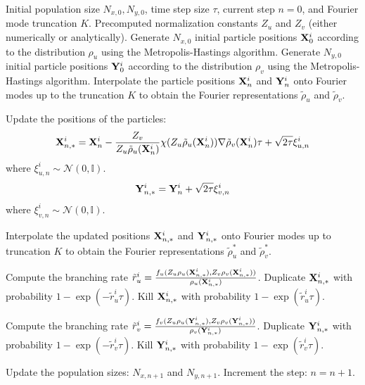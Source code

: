 \documentclass[12pt]{article}
\begin{document}
\begin{algorithm}
\caption{Stochastic Branching Method for the KS Equation}\label{alg:cap}
\begin{algorithmic}
\Require Initial population size $N_{x,0}, N_{y,0}$, time step size $\tau$, current step $n = 0$, and Fourier mode truncation $K$.
\Require Precomputed normalization constants $Z_u$ and $Z_v$ (either numerically or analytically).
\State Generate $N_{x,0}$ initial particle positions $\mathbf{X}^i_0$ according to the distribution $\rho_u$ using the Metropolis-Hastings algorithm.
\State Generate $N_{y,0}$ initial particle positions $\mathbf{Y}^i_0$ according to the distribution $\rho_v$ using the Metropolis-Hastings algorithm.
\State Interpolate the particle positions $\mathbf{X}^i_n$ and $\mathbf{Y}^i_n$ onto Fourier modes up to the truncation $K$ to obtain the Fourier representations $\tilde{\rho}_u$ and $\tilde{\rho}_v$.

 
    \State Update the positions of the particles:
        \[
        \mathbf{X}^i_{n,*} = \mathbf{X}^i_n - \frac{Z_v}{Z_u \tilde{\rho}_u(\mathbf{X}^i_n)} \chi(Z_u \tilde{\rho}_u(\mathbf{X}^i_n)) \nabla \tilde{\rho}_v(\mathbf{X}^i_n) \tau + \sqrt{2\tau} \xi^{i}_{u,n}
        \]
        where $\xi^{i}_{u,n} \sim \mathcal{N}(0, \mathbb{I})$.
    \EndFor
        \[
        \mathbf{Y}^i_{n,*} = \mathbf{Y}^i_n + \sqrt{2\tau} \xi^{i}_{v,n}
        \]
        where $\xi^{i}_{v,n} \sim \mathcal{N}(0, \mathbb{I})$.
    \EndFor

    \State Interpolate the updated positions $\mathbf{X}^i_{n,*}$ and $\mathbf{Y}^i_{n,*}$ onto Fourier modes up to truncation $K$ to obtain the Fourier representations $\tilde{\rho}_u^*$ and $\tilde{\rho}_v^*$.

        \State Compute the branching rate $\tilde{r}_u^i = \frac{f_u(Z_u \rho_u(\mathbf{X}^i_{n,*}), Z_v \rho_v(\mathbf{X}^i_{n,*}))}{\rho_u(\mathbf{X}^i_{n,*})}$.
            \State Duplicate $\mathbf{X}^i_{n,*}$ with probability $1 - \exp(-\tilde{r}_u^i \tau)$.
            \State Kill $\mathbf{X}^i_{n,*}$ with probability $1 - \exp(\tilde{r}_u^i \tau)$.
        \EndIf
    \EndFor

        \State Compute the branching rate $\tilde{r}_v^i = \frac{f_v(Z_u \rho_u(\mathbf{Y}^i_{n,*}), Z_v \rho_v(\mathbf{Y}^i_{n,*}))}{\rho_v(\mathbf{Y}^i_{n,*})}$.
            \State Duplicate $\mathbf{Y}^i_{n,*}$ with probability $1 - \exp(-\tilde{r}_v^i \tau)$.
            \State Kill $\mathbf{Y}^i_{n,*}$ with probability $1 - \exp(\tilde{r}_v^i \tau)$.
        \EndIf
    \EndFor

    \State Update the population sizes: $N_{x,n+1}$ and $N_{y,n+1}$.
    \State Increment the step: $n = n + 1$.
\EndWhile
\end{algorithmic}
\end{algorithm}
\end{document}
